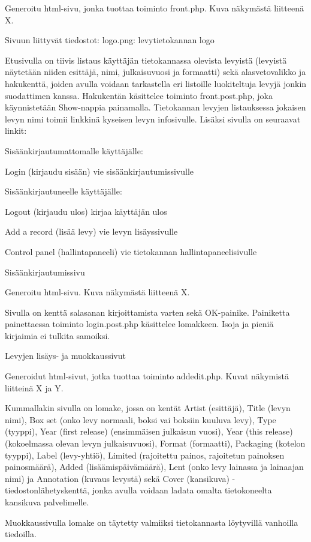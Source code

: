 \documentclass[a4paper,12pt]{report}
\begin{document}
Generoitu html-sivu, jonka tuottaa toiminto front.php. Kuva näkymästä
liitteenä X.

Sivuun liittyvät tiedostot:
	logo.png: levytietokannan logo

Etusivulla on tiivis listaus käyttäjän tietokannassa olevista levyistä 
(levyistä näytetään niiden esittäjä, nimi, julkaisuvuosi ja formaatti) 
sekä alasvetovalikko ja hakukenttä, joiden avulla voidaan tarkastella eri listoille luokiteltuja levyjä jonkin suodattimen kanssa. 
Hakukentän käsittelee toiminto front.post.php, joka käynnistetään Show-nappia painamalla. 
Tietokannan levyjen listauksessa jokaisen levyn nimi toimii linkkinä kyseisen levyn infosivulle. 
Lisäksi sivulla on seuraavat linkit:

Sisäänkirjautumattomalle käyttäjälle:

	Login (kirjaudu sisään)
		vie sisäänkirjautumissivulle

Sisäänkirjautuneelle käyttäjälle:

	Logout (kirjaudu ulos)
		kirjaa käyttäjän ulos

	Add a record (lisää levy)
		vie levyn lisäyssivulle

	Control panel (hallintapaneeli)
		vie tietokannan hallintapaneelisivulle


Sisäänkirjautumissivu

Generoitu html-sivu. Kuva näkymästä liitteenä X.

Sivulla on kenttä salasanan kirjoittamista varten sekä OK-painike. 
Painiketta painettaessa toiminto login.post.php käsittelee lomakkeen. 
Isoja ja pieniä kirjaimia ei tulkita samoiksi.


Levyjen lisäys- ja muokkaussivut

Generoidut html-sivut, jotka tuottaa toiminto addedit.php. Kuvat näkymistä liitteinä X ja Y.

Kummallakin sivulla on lomake, jossa on kentät Artist (esittäjä), Title (levyn nimi), 
Box set (onko levy normaali, boksi vai boksiin kuuluva levy), Type (tyyppi), 
Year (first release) (ensimmäisen julkaisun vuosi), Year (this release) (kokoelmassa olevan levyn julkaisuvuosi), 
Format (formaatti), Packaging (kotelon tyyppi), Label (levy-yhtiö), Limited (rajoitettu painos, rajoitetun painoksen painosmäärä), 
Added (lisäämispäivämäärä), Lent (onko levy lainassa ja lainaajan nimi) ja Annotation (kuvaus levystä) sekä 
Cover (kansikuva) -tiedostonlähetyskenttä, jonka avulla voidaan ladata omalta tietokoneelta kansikuva palvelimelle.

Muokkaussivulla lomake on täytetty valmiiksi tietokannasta löytyvillä vanhoilla tiedoilla.
\end{document}
